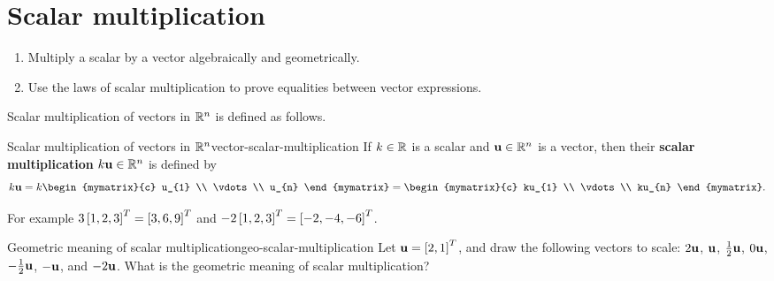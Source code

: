 \section{Scalar multiplication}

\begin{outcome}
  \begin{enumerate}
  \item Multiply a scalar by a vector algebraically and geometrically.
  \item Use the laws of scalar multiplication to prove equalities
    between vector expressions.
  \end{enumerate}
\end{outcome}

Scalar multiplication of vectors in $\mathbb{R}^n$ is defined as
follows.

\begin{definition}{Scalar multiplication of vectors in $\mathbb{R}^n$}{vector-scalar-multiplication}
  If $k\in\mathbb{R}$ is a scalar and $\mbox{\bf u}\in \mathbb{R}^{n}$ is a vector, then
  their
  \textbf{scalar multiplication}%
  $k\mbox{\bf u}\in \mathbb{R}^{n}$ is defined by
  \begin{equation*}
    k\vect{u}=k\begin{mymatrix}{c}
      u_{1} \\
      \vdots \\
      u_{n}
    \end{mymatrix} = \begin{mymatrix}{c}
      ku_{1} \\
      \vdots \\
      ku_{n}
    \end{mymatrix}.
  \end{equation*}
\end{definition}

For example $3 \left[ 1, 2, 3 \right]^T = \left[ 3, 6, 9 \right]^T$ and
$-2\left[ 1, 2, 3 \right]^T = \left[ -2, -4, -6 \right]^T$.

\begin{example}{Geometric meaning of scalar multiplication}{geo-scalar-multiplication}
  Let $\mbox{\bf u}=\left[2,1\right]^T$, and draw the following vectors to scale:
  $2\mbox{\bf u}$, $\mbox{\bf u}$, $\frac{1}{2}\mbox{\bf u}$, $0\mbox{\bf u}$,
  $-\frac{1}{2}\mbox{\bf u}$, $-\mbox{\bf u}$, and $-2\mbox{\bf u}$.  What is the
  geometric meaning of scalar multiplication?
\end{example}

